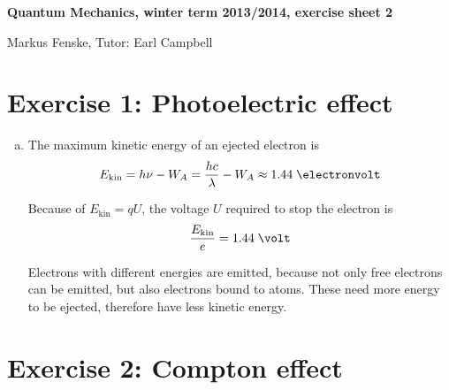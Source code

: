 \documentclass[a4paper,german,12pt,smallheadings]{scrartcl}
\begin{document}
\begin{center}
\bfseries %
\sffamily %
\vspace{-40pt}
Quantum Mechanics, winter term 2013/2014, exercise sheet 2

Markus Fenske, Tutor: Earl Campbell
\vspace{-10pt}
\end{center}

\section*{Exercise 1: Photoelectric effect}

\begin{enumerate}[a)]
  \item
    The maximum kinetic energy of an ejected electron is
    \begin{equation*}
      E_\text{kin} = h \nu - W_A = \frac{hc}{\lambda} - W_A \approx 1.44 \; \electronvolt
    \end{equation*}

    Because of $E_\text{kin} = q U$, the voltage $U$ required to stop the electron is
    \begin{equation*}
      \frac{E_\text{kin}}{e} = 1.44 \; \volt
    \end{equation*}

    Electrons with different energies are emitted, because not only free
    electrons can be emitted, but also electrons bound to atoms. These need
    more energy to be ejected, therefore have less kinetic energy.


\end{enumerate}

\section*{Exercise 2: Compton effect}
\end{document}
